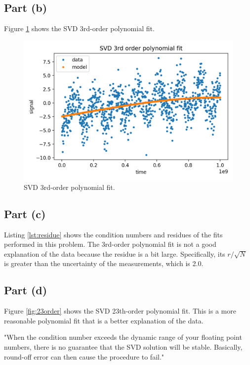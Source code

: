 \documentclass[11pt]{article}
\begin{document}
\subsection{Part (b)}
Figure \ref{fig:3order} shows the SVD 3rd-order polynomial fit.
\begin{figure}[H]
    \centering
    \includegraphics[scale = 0.7]{images/ps-5-3b.png}
    \caption{SVD 3rd-order polynomial fit.}
    \label{fig:3order}
\end{figure}

\subsection{Part (c)}
Listing \ref{lst:residue} shows the condition numbers and residues of the fits performed in this problem. The 3rd-order polynomial fit is not a good explanation of the data because the residue is a bit large. Specifically, its $r / \sqrt{N}$ is greater than the uncertainty of the measurements, which is 2.0.



\subsection{Part (d)}
Figure \ref{fig:23order} shows the SVD 23th-order polynomial fit. This is a more reasonable polynomial fit that is a better explanation of the data.

"When the condition number exceeds the dynamic range of your floating point numbers, there is no guarantee that the SVD solution will be stable. Basically, round-off error can then cause the procedure to fail."
\end{document}
